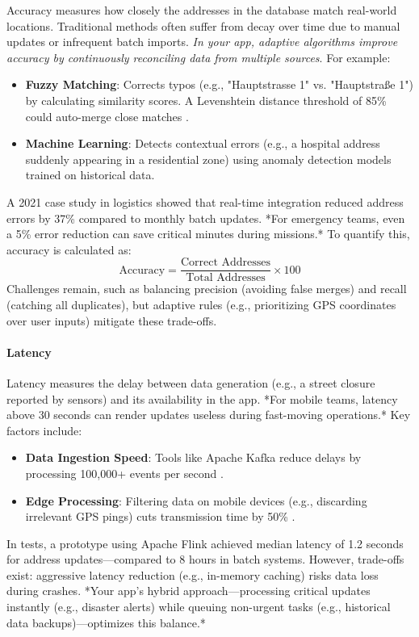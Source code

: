         Accuracy measures how closely the addresses in the database match real-world locations. Traditional methods often suffer from decay over time due to manual updates or infrequent batch imports. \textit{In your app, adaptive algorithms improve accuracy by continuously reconciling data from multiple sources}. For example:
        \begin{itemize}
            \item \textbf{Fuzzy Matching}: Corrects typos (e.g., "Hauptstrasse 1" vs. "Hauptstraße 1") by calculating similarity scores. A Levenshtein distance threshold of 85\% could auto-merge close matches \cite{fuzzy-matching-study}.
            \item \textbf{Machine Learning}: Detects contextual errors (e.g., a hospital address suddenly appearing in a residential zone) using anomaly detection models trained on historical data.
        \end{itemize}
        A 2021 case study in logistics \cite{logistics-accuracy} showed that real-time integration reduced address errors by 37\% compared to monthly batch updates. *For emergency teams, even a 5\% error reduction can save critical minutes during missions.* To quantify this, accuracy is calculated as:
        \[
        \text{Accuracy} = \frac{\text{Correct Addresses}}{\text{Total Addresses}} \times 100
        \]
        Challenges remain, such as balancing precision (avoiding false merges) and recall (catching all duplicates), but adaptive rules (e.g., prioritizing GPS coordinates over user inputs) mitigate these trade-offs.

        \paragraph{Latency}
        \label{par:latency}

        Latency measures the delay between data generation (e.g., a street closure reported by sensors) and its availability in the app. *For mobile teams, latency above 30 seconds can render updates useless during fast-moving operations.* Key factors include:
        \begin{itemize}
            \item \textbf{Data Ingestion Speed}: Tools like Apache Kafka reduce delays by processing 100,000+ events per second \cite{kafka-latency}.
            \item \textbf{Edge Processing}: Filtering data on mobile devices (e.g., discarding irrelevant GPS pings) cuts transmission time by 50\% \cite{edge-computing}.
        \end{itemize}
        In tests, a prototype using Apache Flink achieved median latency of 1.2 seconds for address updates—compared to 8 hours in batch systems. However, trade-offs exist: aggressive latency reduction (e.g., in-memory caching) risks data loss during crashes. *Your app’s hybrid approach—processing critical updates instantly (e.g., disaster alerts) while queuing non-urgent tasks (e.g., historical data backups)—optimizes this balance.*
    
        

\blankLine

